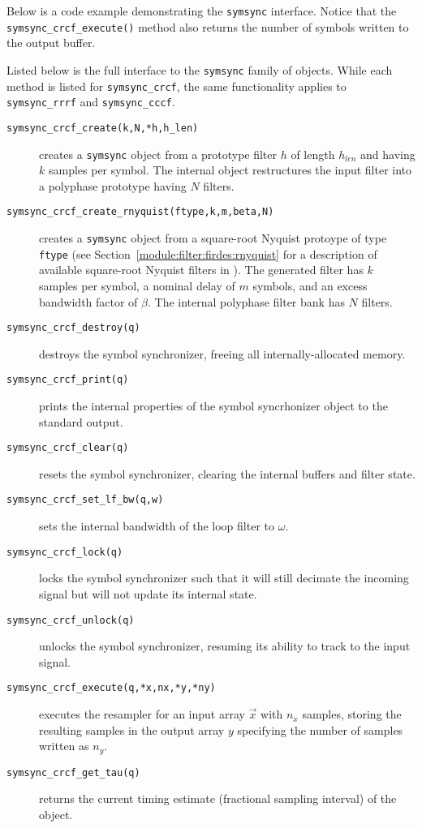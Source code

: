 Below is a code example demonstrating the {\tt symsync} interface.
Notice that the {\tt symsync\_crcf\_execute()} method also returns the
number of symbols written to the output buffer.
%

%
Listed below is the full interface to the {\tt symsync} family of
objects.
While each method is listed for {\tt symsync\_crcf}, the same
functionality applies to {\tt symsync\_rrrf} and {\tt symsync\_cccf}.
%
\begin{description}
\item[{\tt symsync\_crcf\_create(k,N,*h,h\_len)}]
    creates a {\tt symsync} object from a prototype filter $h$ of length
    $h_{len}$ and having $k$ samples per symbol.
    The internal object restructures the input filter into a polyphase
    prototype having $N$ filters.
\item[{\tt symsync\_crcf\_create\_rnyquist(ftype,k,m,beta,N)}]
    creates a {\tt symsync} object from a square-root Nyquist protoype
    of type {\tt ftype} (see Section~\ref{module:filter:firdes:rnyquist}
    for a description of available square-root Nyquist filters in
    \liquid).
    The generated filter has $k$ samples per symbol,
    a nominal delay of $m$ symbols, and an excess bandwidth factor of
    $\beta$.
    The internal polyphase filter bank has $N$ filters.
\item[{\tt symsync\_crcf\_destroy(q)}]
    destroys the symbol synchronizer, freeing all internally-allocated
    memory.
\item[{\tt symsync\_crcf\_print(q)}]
    prints the internal properties of the symbol syncrhonizer object to
    the standard output.
\item[{\tt symsync\_crcf\_clear(q)}]
    resets the symbol synchronizer, clearing the internal buffers and
    filter state.
\item[{\tt symsync\_crcf\_set\_lf\_bw(q,w)}]
    sets the internal bandwidth of the loop filter to $\omega$.
\item[{\tt symsync\_crcf\_lock(q)}]
    locks the symbol synchronizer such that it will still decimate the
    incoming signal but will not update its internal state.
\item[{\tt symsync\_crcf\_unlock(q)}]
    unlocks the symbol synchronizer, resuming its ability to track to
    the input signal.
\item[{\tt symsync\_crcf\_execute(q,*x,nx,*y,*ny)}]
    executes the resampler for an input array $\vec{x}$ with $n_x$
    samples,
    storing the resulting samples in the output array $y$
    specifying the number of samples written as $n_y$.
\item[{\tt symsync\_crcf\_get\_tau(q)}]
    returns the current timing estimate (fractional sampling interval)
    of the object.
\end{description}
%

